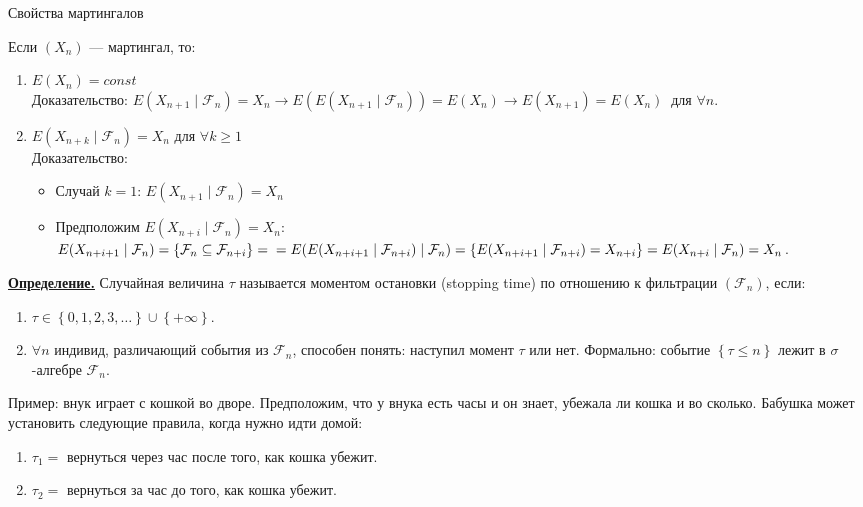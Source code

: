 \documentclass[a4paper]{article}
\begin{document}
\begin{center}{\large Свойства мартингалов}\end{center}
Если $(X_{n})$ — мартингал, то:
\begin{enumerate}
	\item $E(X_{n})=const$ \\ Доказательство: $E(X_{n+1}\mid \mathcal{F}_{n})=X_{n} \rightarrow E(E(X_{n+1}\mid \mathcal{F}_{n}))=E(X_{n}) \rightarrow E(X_{n+1})=E(X_{n}) \ $ для $\forall n$.
	\item $E(X_{n+k}\mid \mathcal{F}_{n})=X_{n}$ для $\forall k\geq1$ \\ Доказательство:
	\begin{itemize}
		\item Случай $k = 1$: \quad $E(X_{n+1}\mid \mathcal{F}_{n})=X_{n}$
		\item Предположим $E(X_{n+i}\mid \mathcal{F}_{n})=X_{n}$: \quad $E(X_{n+i+1}\mid \mathcal{F}_{n})=\left\lbrace \mathcal{F}_{n} \subseteq \mathcal{F}_{n+i}  \right\rbrace = \\ =E(E(X_{n+i+1}\mid \mathcal{F}_{n+i})\mid \mathcal{F}_{n})=\left\lbrace   E(X_{n+i+1}\mid \mathcal{F}_{n+i}) = X_{n+i} \right\rbrace =E(X_{n+i}\mid \mathcal{F}_{n})=X_{n}$.
	\end{itemize}
\end{enumerate}
\par{\bf\underline{Определение.}} Случайная величина $\tau$ называется моментом остановки (stopping time) по отношению к фильтрации $(\mathcal{F}_{n})$, если:
\begin{enumerate}
	\item $\tau \in \left\lbrace 0,1,2,3,\ldots \right\rbrace \cup \left\lbrace +\infty \right\rbrace $.
	\item $\forall n$ индивид, различающий события из $\mathcal{F}_{n}$, способен понять: наступил момент $\tau$ или нет. Формально: событие $\left\lbrace \tau \leq n \right\rbrace$ лежит в $\sigma$-алгебре $\mathcal{F}_{n}$.
\end{enumerate}
\par{Пример:} внук играет с кошкой во дворе. Предположим, что  у внука есть часы и он знает, убежала ли кошка и во сколько. Бабушка может установить следующие правила, когда нужно идти домой:
\begin{enumerate}
	\item $\tau_{1}=$ вернуться через час после того, как кошка убежит.
	\item $\tau_{2}=$ вернуться за час до того, как кошка убежит.
\end{enumerate}
\end{document}
